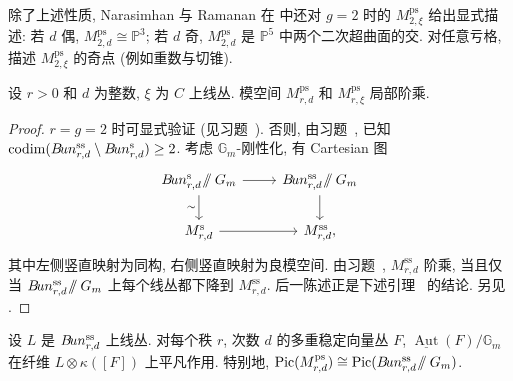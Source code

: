\begin{remark}\label{src:9.4.11}
除了上述性质, Narasimhan 与 Ramanan 在 \cite{NR69} 中还对 $g=2$ 时的 $M_{2,\xi}^{\mathrm{ps}}$ 给出显式描述: 若 $d$ 偶, $M_{2,d}^{\mathrm{ps}}\cong\mathbb P^3$; 若 $d$ 奇, $M_{2,d}^{\mathrm{ps}}$ 是 $\mathbb P^5$ 中两个二次超曲面的交. 对任意亏格, \cite{Las96} 描述 $M_{2,\xi}^{\mathrm{ps}}$ 的奇点 (例如重数与切锥).
\end{remark}
\begin{proposition}\label{src:9.4.12}
设 $r>0$ 和 $d$ 为整数, $\xi$ 为 $C$ 上线丛. 模空间 $M_{r,d}^{\mathrm{ps}}$ 和 $M_{r,\xi}^{\mathrm{ps}}$ 局部阶乘.
\end{proposition}
\begin{proof}
$r=g=2$ 时可显式验证 (见习题~). 否则, 由习题~, 已知 $\operatorname{codim}(B\!un_{r,d}^{\mathrm{ss}}\setminus B\!un_{r,d}^{\mathrm s})\geq2$. 考虑 $\mathbb G_m$-刚性化, 有 Cartesian 图
\[
\begin{tikzcd}[ampersand replacement=\&]
\cBun_{r,d}^{\mathrm s}\!\sslash\mathbb G_m\arrow[r]\arrow[d,"\sim"']\&\cBun_{r,d}^{\mathrm{ss}}\!\sslash\mathbb G_m\arrow[d]\\
M_{r,d}^{\mathrm s}\arrow[r]\&M_{r,d}^{\mathrm{ss}},
\end{tikzcd}
\]
其中左侧竖直映射为同构, 右侧竖直映射为良模空间. 由习题~, $M_{r,d}^{\mathrm{ss}}$ 阶乘, 当且仅当 $B\!un_{r,d}^{\mathrm{ss}}\!\mathbin{/\mkern-6mu/}G_m$ 上每个线丛都下降到 $M_{r,d}^{\mathrm{ss}}$. 后一陈述正是下述引理~ 的结论. 另见 \cite[定理 A]{DN89}.
\end{proof}
\begin{lemma}\label{src:9.4.13}
设 $L$ 是 $B\!un_{r,d}^{\mathrm{ss}}$ 上线丛. 对每个秩 $r$, 次数 $d$ 的多重稳定向量丛 $F$, $\underline{\operatorname{Aut}}(F)/\mathbb G_m$ 在纤维 $L\otimes\kappa([F])$ 上平凡作用. 特别地, $\operatorname{Pic}(M_{r,d}^{\mathrm{ps}})\cong\operatorname{Pic}(B\!un_{r,d}^{\mathrm{ss}}\!\mathbin{/\mkern-6mu/}G_m)$.
\end{lemma}
